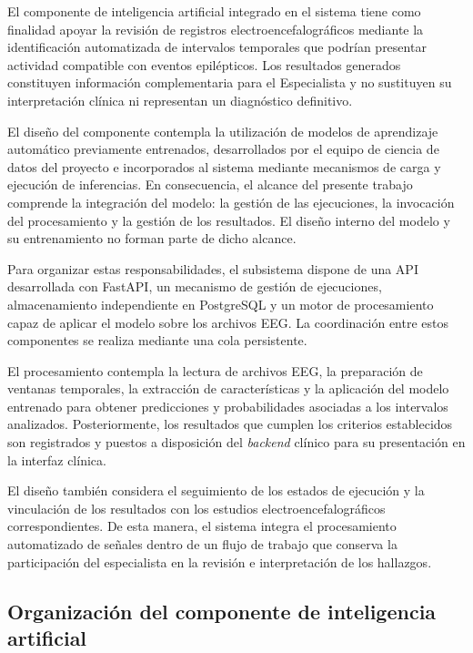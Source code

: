 El componente de inteligencia artificial integrado en el sistema tiene como finalidad apoyar la revisión de
registros electroencefalográficos mediante la
identificación automatizada de intervalos temporales
que podrían presentar actividad compatible con
eventos epilépticos. Los resultados generados
constituyen información complementaria para el
Especialista y no sustituyen su interpretación
clínica ni representan un diagnóstico definitivo.

El diseño del componente contempla la utilización de modelos de aprendizaje automático previamente entrenados, desarrollados por el equipo de ciencia de datos del proyecto e incorporados al sistema mediante mecanismos de carga y ejecución de inferencias.
En consecuencia, el alcance del presente trabajo comprende la integración del modelo: la gestión de las ejecuciones, la invocación del procesamiento y la gestión de los resultados.
El diseño interno del modelo y su entrenamiento no forman parte de dicho alcance.

Para organizar estas responsabilidades, el
subsistema dispone de una API desarrollada
con FastAPI, un mecanismo de gestión de
ejecuciones, almacenamiento independiente
en PostgreSQL y un motor de procesamiento
capaz de aplicar el modelo sobre los archivos
EEG. La coordinación entre estos componentes se realiza mediante una cola persistente.

El procesamiento contempla la lectura de
archivos EEG, la preparación de ventanas
temporales, la extracción de características
y la aplicación del modelo entrenado para
obtener predicciones y probabilidades
asociadas a los intervalos analizados.
Posteriormente, los resultados que cumplen
los criterios establecidos son registrados
y puestos a disposición del \textit{backend} clínico
para su presentación en la interfaz clínica.

El diseño también considera el seguimiento
de los estados de ejecución y la vinculación
de los resultados con los estudios
electroencefalográficos correspondientes.
De esta manera, el sistema integra el
procesamiento automatizado de señales
dentro de un flujo de trabajo que conserva
la participación del especialista en la
revisión e interpretación de los hallazgos.

\subsection{Organización del componente de inteligencia artificial}
\label{subsec:organizacion-componente-ia}

